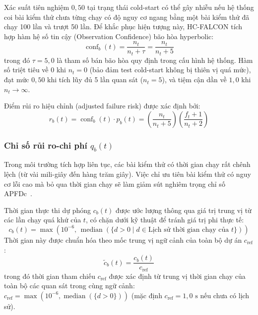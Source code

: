Xác suất tiên nghiệm $0{,}50$ tại trạng thái cold-start có thể gây nhiễu nếu hệ thống coi bài kiểm thử chưa từng chạy có độ nguy cơ ngang bằng một bài kiểm thử đã chạy 100 lần và trượt 50 lần. Để khắc phục hiện tượng này, HC-FALCON tích hợp hàm hệ số tin cậy (Observation Confidence) bão hòa hyperbolic:
\begin{equation}
\label{eq:confidence_tau}
\operatorname{conf}_b(t) = \frac{n_t}{n_t + \tau} = \frac{n_t}{n_t + 5}
\end{equation}
trong đó $\tau = 5{,}0$ là tham số bán bão hòa quy định trong cấu hình hệ thống. Hàm số triệt tiêu về $0$ khi $n_t = 0$ (bảo đảm test cold-start không bị thiên vị quá mức), đạt mức $0{,}50$ khi tích lũy đủ 5 lần quan sát ($n_t = 5$), và tiệm cận dần về $1{,}0$ khi $n_t \to \infty$.

Điểm rủi ro hiệu chỉnh (adjusted failure risk) được xác định bởi:
\begin{equation}
\label{eq:adjusted_risk}
r_b(t) = \operatorname{conf}_b(t) \cdot p_b(t) = \left(\frac{n_t}{n_t + 5}\right) \left(\frac{f_t + 1}{n_t + 2}\right)
\end{equation}

\subsubsection{Chỉ số rủi ro-chi phí \texorpdfstring{$q_b(t)$}{qb(t)}}
\label{subsubsec:risk_cost_score}

Trong môi trường tích hợp liên tục, các bài kiểm thử có thời gian chạy rất chênh lệch (từ vài mili-giây đến hàng trăm giây). Việc chỉ ưu tiên bài kiểm thử có nguy cơ lỗi cao mà bỏ qua thời gian chạy sẽ làm giảm sút nghiêm trọng chỉ số APFDc~\cite{elbaum2001incorporating}. 

Thời gian thực thi dự phóng $c_b(t)$ được ước lượng thông qua giá trị trung vị từ các lần chạy quá khứ của $t$, có chặn dưới kỹ thuật để tránh giá trị phi thực tế:
\begin{equation}
c_b(t) = \max\left(10^{-6}, \, \operatorname{median}\left(\{d > 0 \mid d \in \text{Lịch sử thời gian chạy của } t\}\right)\right)
\end{equation}
Thời gian này được chuẩn hóa theo mốc trung vị ngữ cảnh của toàn bộ dự án $c_{\text{ref}}$:
\begin{equation}
\label{eq:norm_cost}
\widetilde{c}_b(t) = \frac{c_b(t)}{c_{\text{ref}}}
\end{equation}
trong đó thời gian tham chiếu $c_{\text{ref}}$ được xác định từ trung vị thời gian chạy của toàn bộ các quan sát trong cùng ngữ cảnh: $c_{\text{ref}} = \max(10^{-6}, \operatorname{median}(\{d > 0\}))$ (mặc định $c_{\text{ref}} = 1{,}0\text{ s}$ nếu chưa có lịch sử).

